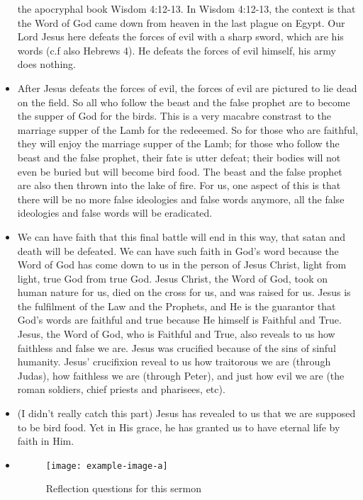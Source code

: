 \begin{itemize}
{  the apocryphal book Wisdom 4:12-13.  In Wisdom 4:12-13, the context is that
  the Word of God came down from heaven in the last plague on Egypt.  Our
  Lord Jesus here defeats the forces of evil with a sharp sword, which are
  his words (c.f also Hebrews 4).  He defeats the forces of evil himself, his
  army does nothing.  }
  \item{After Jesus defeats the forces of evil, the forces of evil are
  pictured to lie dead on the field.  So all who follow the beast and the
  false prophet are to become the supper of God for the birds.  This is a
  very macabre constrast to the marriage supper of the Lamb for the
  redeeemed.  So for those who are faithful, they will enjoy the marriage
  supper of the Lamb; for those who follow the beast and the false prophet,
  their fate is utter defeat; their bodies will not even be buried but will
  become bird food.  The beast and the false prophet are also then thrown
  into the lake of fire.  For us, one aspect of this is that there will be no
  more false ideologies and false words anymore, all the false ideologies and
  false words will be eradicated.}
  \item{We can have faith that this final battle will end in this way, that
  satan and death will be defeated.  We can have such faith in God's word
  because the Word of God has come down to us in the person of Jesus Christ,
  light from light, true God from true God.  Jesus Christ, the Word of God,
  took on human nature for us, died on the cross for us, and was raised for
  us.  Jesus is the fulfilment of the Law and the Prophets, and He is the
  guarantor that God's words are faithful and true because He himself is
  Faithful and True.  Jesus, the Word of God, who is Faithful and True, also
  reveals to us how faithless and false we are.  Jesus was crucified because
  of the sins of sinful humanity.  Jesus' crucifixion reveal to us how
  traitorous we are (through Judas), how faithless we are (through Peter),
  and just how evil we are (the roman soldiers, chief priests and pharisees,
  etc). }
  \item{(I didn't really catch this part) Jesus has revealed to us that we
  are supposed to be bird food.  Yet in His grace, he has granted us to have
  eternal life by faith in Him.  }
  \item{\begin{figure}[H]
    \centering
    \texttt{[image: example-image-a]}
    \caption[]{Reflection questions for this sermon}
    \label{}
  \end{figure}}
\end{itemize}